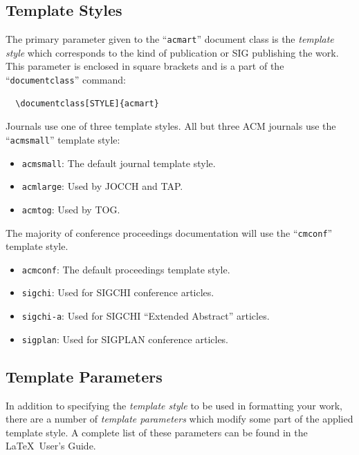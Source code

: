 \documentclass[manuscript,screen,review]{acmart}
\providecommand{\tightlist}{%
  \setlength{\itemsep}{0pt}\setlength{\parskip}{0pt}}\usepackage{longtable,booktabs,array}
\begin{document}
\hypertarget{template-styles}{%
\subsection{Template Styles}\label{template-styles}}

The primary parameter given to the ``\texttt{acmart}'' document class is
the \emph{template style} which corresponds to the kind of publication
or SIG publishing the work. This parameter is enclosed in square
brackets and is a part of the ``\texttt{documentclass}'' command:

\begin{verbatim}
  \documentclass[STYLE]{acmart}
\end{verbatim}

Journals use one of three template styles. All but three ACM journals
use the ``\texttt{acmsmall}'' template style:

\begin{itemize}
\tightlist
\item
  \texttt{acmsmall}: The default journal template style.
\item
  \texttt{acmlarge}: Used by JOCCH and TAP.
\item
  \texttt{acmtog}: Used by TOG.
\end{itemize}

The majority of conference proceedings documentation will use the
``\texttt{cmconf}'' template style.

\begin{itemize}
\tightlist
\item
  \texttt{acmconf}: The default proceedings template style.
\item
  \texttt{sigchi}: Used for SIGCHI conference articles.
\item
  \texttt{sigchi-a}: Used for SIGCHI ``Extended Abstract'' articles.
\item
  \texttt{sigplan}: Used for SIGPLAN conference articles.
\end{itemize}

\hypertarget{template-parameters}{%
\subsection{Template Parameters}\label{template-parameters}}

In addition to specifying the \emph{template style} to be used in
formatting your work, there are a number of \emph{template parameters}
which modify some part of the applied template style. A complete list of
these parameters can be found in the \LaTeX~User's Guide.
\end{document}
